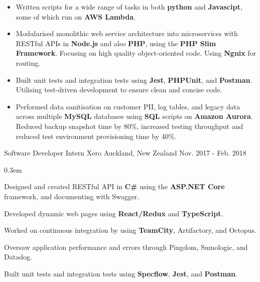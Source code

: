 \begin{cventries}
{\begin{cvitems}
{\begin{itemize}[leftmargin=14pt,topsep=5pt]
                \item {Written scripts for a wide range of tasks in both \textbf{python} and \textbf{Javascipt}, some of which run on \textbf{AWS Lambda}.}
              \end{itemize}}
        \item[] {
            \begin{itemize}[leftmargin=14pt,topsep=5pt] %
                \itemsep0.3em
                \item {Modularised monolithic web service architecture into microservices with RESTful APIs in \textbf{Node.js} and also \textbf{PHP}, using the \textbf{PHP Slim Framework}. Focusing on high quality object-oriented code. Using \textbf{Ngnix} for routing.}
                \item {Built unit tests and integration tests using \textbf{Jest}, \textbf{PHPUnit}, and \textbf{Postman}. Utilising test-driven development to ensure clean and concise code.}
                \item {Performed data sanitisation on customer PII, log tables, and legacy data across multiple \textbf{MySQL} databases using \textbf{SQL} scripts on \textbf{Amazon Aurora}. Reduced backup snapshot time by 80\%, increased testing throughput and reduced test environment provisioning time by 40\%.}
              \end{itemize}}
      \end{cvitems}
    }

  \cventry
    {Software Developer Intern} %
    {Xero} %
    {Auckland, New Zealand} %
    {Nov. 2017 - Feb. 2018} %
    {
      \begin{cvitems2} %
        \itemsep0.3em
        \item {Designed and created RESTful API in \textbf{C\#} using the \textbf{ASP.NET Core} framework, and documenting with Swagger.}
        \item {Developed dynamic web pages using \textbf{React/Redux} and \textbf{TypeScript}.}
        \item {Worked on continuous integration by using \textbf{TeamCity}, Artifactory, and Octopus.}
        \item {Oversaw application performance and errors through Pingdom, Sumologic, and Datadog.}
        \item {Built unit tests and integration tests using \textbf{Specflow}, \textbf{Jest}, and \textbf{Postman}.}
      \end{cvitems2}
    }


\end{cventries}
